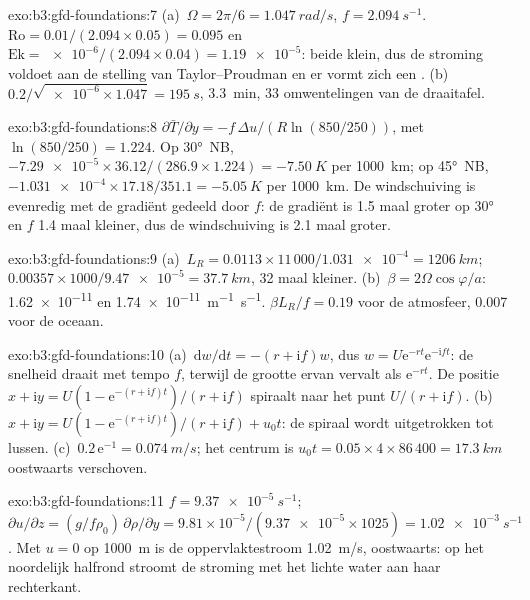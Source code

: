 \begin{solution}{exo:b3:gfd-foundations:7}
(a)~$\Omega = 2\pi/6 = \qty{1.047}{rad/s}$, $f = \qty{2.094}{s^{-1}}$.
$\mathrm{Ro} = 0.01/(2.094\times0.05) = 0.095$ en $\mathrm{Ek} =
\num{e-6}/(2.094\times0.04) = \num{1.19e-5}$: beide klein, dus de stroming voldoet aan
de stelling van Taylor--Proudman en er vormt zich een . (b)~$0.2/\sqrt{\num{e-6}
\times1.047} = \qty{195}{s}$, \qty{3.3}{min}, 33 omwentelingen van de draaitafel.
\end{solution}

\begin{solution}{exo:b3:gfd-foundations:8}
\sloppy $\partial\bar T/\partial y = -f\,\Delta u/(R\ln(850/250))$, met
$\ln(850/250) = 1.224$. Op \ang{30}~NB, $-\num{7.29e-5}\times36.12/(286.9
\times1.224) = \qty{-7.50}{K}$ per \qty{1000}{km}; op \ang{45}~NB,
$-\num{1.031e-4}\times17.18/351.1 = \qty{-5.05}{K}$ per \qty{1000}{km}. De
windschuiving is evenredig met de gradiënt gedeeld door $f$: de gradiënt is 1.5
maal groter op \ang{30} en $f$ 1.4 maal kleiner, dus de windschuiving is 2.1 maal
groter.\par
\end{solution}

\begin{solution}{exo:b3:gfd-foundations:9}
(a)~$L_R = 0.0113\times11\,000/\num{1.031e-4} = \qty{1206}{km}$;
$0.00357\times1000/\num{9.47e-5} = \qty{37.7}{km}$, 32 maal kleiner.
(b)~$\beta = 2\Omega\cos\varphi/a$: \num{1.62e-11} en
\qty{1.74e-11}{m^{-1}.s^{-1}}. $\beta L_R/f = 0.19$ voor de atmosfeer, 0.007
voor de oceaan.
\end{solution}

\begin{solution}{exo:b3:gfd-foundations:10}
(a)~$\mathrm dw/\mathrm dt = -(r + \mathrm if)w$, dus $w = U\mathrm
e^{-rt}\mathrm e^{-\mathrm ift}$: de snelheid draait met tempo $f$, terwijl
de grootte ervan vervalt als $\mathrm e^{-rt}$. De positie $x + \mathrm iy =
U(1 - \mathrm e^{-(r + \mathrm if)t})/(r + \mathrm if)$ spiraalt naar het
punt $U/(r + \mathrm if)$. (b)~$x + \mathrm iy = U(1 - \mathrm e^{-(r +
\mathrm if)t})/(r + \mathrm if) + u_0t$: de spiraal wordt uitgetrokken tot lussen.
(c)~$0.2\,\mathrm e^{-1} = \qty{0.074}{m/s}$; het centrum is $u_0t =
0.05\times4\times86\,400 = \qty{17.3}{km}$ oostwaarts verschoven.
\end{solution}

\begin{solution}{exo:b3:gfd-foundations:11}
$f = \qty{9.37e-5}{s^{-1}}$; $\partial u/\partial z = (g/f\rho_0)\,\partial
\rho/\partial y = 9.81\times10^{-5}/(\num{9.37e-5}\times1025) =
\qty{1.02e-3}{s^{-1}}$. Met $u = 0$ op \qty{1000}{m} is de oppervlaktestroom
\qty{1.02}{m/s}, oostwaarts: op het noordelijk halfrond stroomt de stroming
met het lichte water aan haar rechterkant.
\end{solution}

